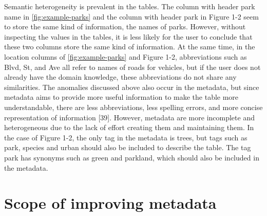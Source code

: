 Semantic heterogeneity is prevalent in the tables. The column with header park name in \autoref{fig:example-parks} and the column with header park in Figure 1-2 seem to store the same kind of information, the names of parks. However, without inspecting the values in the tables, it is less likely for the user to conclude that these two columns store the same kind of information. At the same time, in the location columns of \autoref{fig:example-parks} and Figure 1-2, abbreviations such as Blvd, St, and Ave all refer to names of roads for vehicles, but if the user does not already have the domain knowledge, these abbreviations do not share any similarities.
The anomalies discussed above also occur in the metadata, but since metadata aims to provide more useful information to make the table more understandable, there are less abbreviations, less spelling errors, and more concise representation of information \cite{Rahm2016Case}[39]. However, metadata are more incomplete and heterogeneous due to the lack of effort creating them and maintaining them. In the case of Figure 1-2, the only tag in the metadata is trees, but tags such as park, species and urban should also be included to describe the table. The tag park has synonyms such as green and parkland, which should also be included in the metadata.

\section{Scope of improving metadata}
\label{sec:ScopeOfImprovingMetadata}

